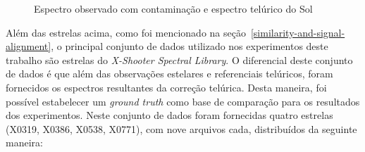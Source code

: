 \begin{figure}[htb]
  \centering
  \hfill
  \caption{Espectro observado com contaminação e espectro telúrico do Sol}
  \label{fig:two-stars-sun}
\end{figure}


Além das estrelas acima, como foi mencionado na seção~\ref{similarity-and-signal-alignment}, o principal conjunto de dados utilizado nos experimentos deste trabalho são estrelas do \textit{X-Shooter Spectral Library}. O diferencial deste conjunto de dados é que além das observações estelares e referenciais telúricos, foram fornecidos os espectros resultantes da correção telúrica. Desta maneira, foi possível estabelecer um \textit{ground truth} como base de comparação para os resultados dos experimentos. Neste conjunto de dados foram fornecidas quatro estrelas (X0319, X0386, X0538, X0771), com nove arquivos cada, distribuídos da seguinte maneira:

